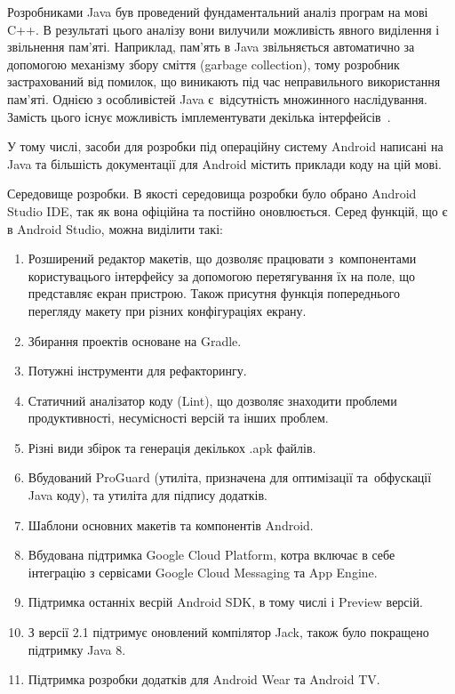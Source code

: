 \documentclass[../main.tex]{subfiles}
\begin{document}
Розробниками Java був проведений фундаментальний аналіз програм на мові C++. В результаті цього аналізу вони вилучили можливість явного виділення і звільнення пам'яті. Наприклад, пам'ять в Java звільняється автоматично за допомогою механізму збору сміття (garbage collection), тому розробник застрахований від помилок, що виникають під час неправильного використання пам'яті. Однією з особливістей Java є~відсутність множинного наслідування. Замість цього існує можливість імплементувати декілька інтерфейсів~\cite{thinking_java}.

У тому числі, засоби для розробки під операційну систему Android написані на Java та більшість документації для Android містить приклади коду на цій мові.

Середовище розробки.
В якості середовища розробки було обрано Android Studio IDE, так як вона офіційна та постійно оновлюється. Серед функцій, що є в Android Studio, можна виділити такі:

\begin{enumerate}
	\item Розширений редактор макетів, що дозволяє працювати з~компонентами користувацього інтерфейсу за допомогою перетягування їх на поле, що представляє екран пристрою. Також присутня функція попереднього перегляду макету при різних конфігураціях екрану.
	\item Збирання проектів основане на Gradle.
	\item Потужні інструменти для рефакторингу.
	\item Статичний аналізатор коду (Lint), що дозволяє знаходити проблеми продуктивності, несумісності версій та інших проблем.
	\item Різні види збірок та генерація декількох .apk файлів.
	\item Вбудований ProGuard (утиліта, призначена для оптимізації та~обфускації Java коду), та утиліта для підпису додатків.
	\item Шаблони основних макетів та компонентів Android.
	\item Вбудована підтримка Google Cloud Platform, котра включає в себе інтеграцію з сервісами Google Cloud Messaging та App Engine.
	\item Підтримка останніх весрій Android SDK, в тому числі і Preview версій.
	\item З версії 2.1 підтримує оновлений компілятор Jack, також було покращено підтримку Java 8.
	\item Підтримка розробки додатків для Android Wear та Android TV.
\end{enumerate}
\end{document}
